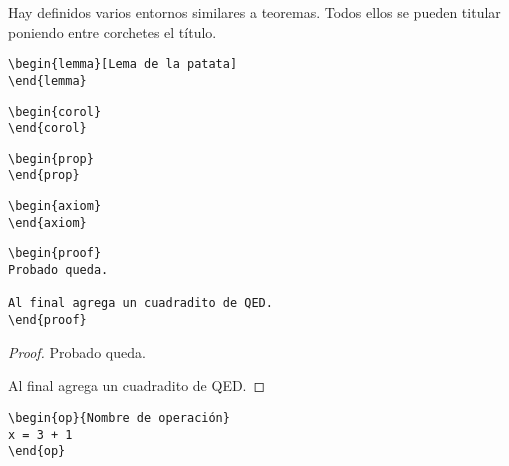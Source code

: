 \documentclass[nochap]{apuntes}
\begin{document}
Hay definidos varios entornos similares a teoremas. Todos ellos se pueden titular poniendo entre corchetes el título.

\begin{verbatim}
\begin{lemma}[Lema de la patata]
\end{lemma}
\end{verbatim}

\begin{lemma}
\end{lemma}

\begin{verbatim}
\begin{corol}
\end{corol}
\end{verbatim}

\begin{corol}
\end{corol}

\begin{verbatim}
\begin{prop}
\end{prop}
\end{verbatim}

\begin{prop}
\end{prop}

\begin{verbatim}
\begin{axiom}
\end{axiom}
\end{verbatim}

\begin{axiom}
\end{axiom}

\begin{verbatim}
\begin{proof}
Probado queda.

Al final agrega un cuadradito de QED.
\end{proof}
\end{verbatim}

\begin{proof}
Probado queda.

Al final agrega un cuadradito de QED.
\end{proof}

\begin{verbatim}
\begin{op}{Nombre de operación}
x = 3 + 1
\end{op}
\end{verbatim}
\end{document}
